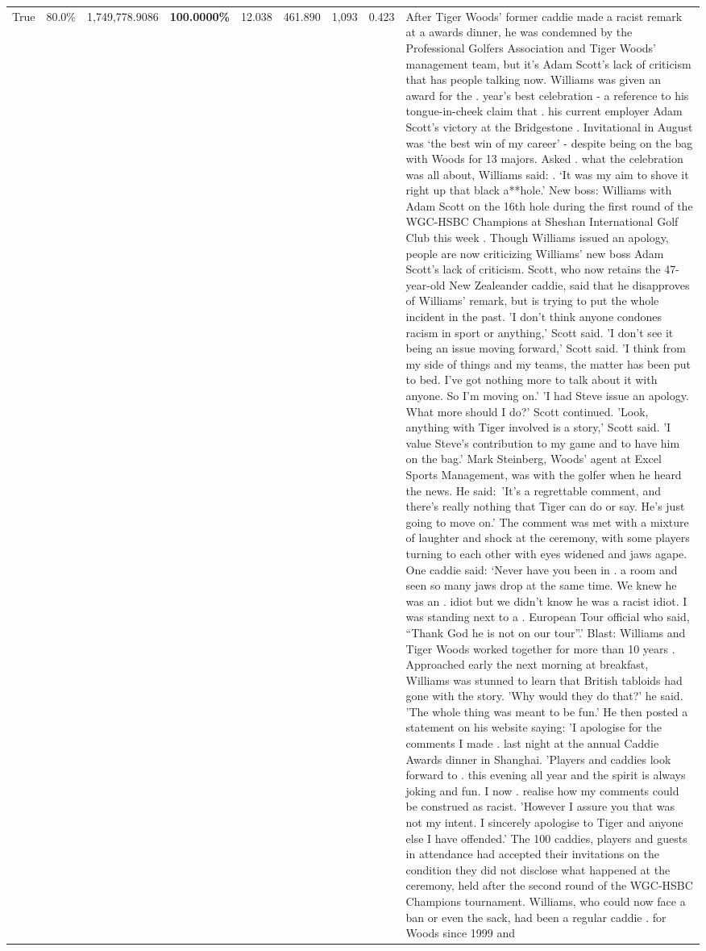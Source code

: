 \begin{table}[H]
\begin{tabular}{lllrlllll}
True & 80.0\% & 1,749,778.9086 & \bfseries \color{red} 100.0000\% & 12.038 & 461.890 & 1,093 & 0.423 & After Tiger Woods' former caddie made a racist remark at a awards dinner, he was condemned by the Professional Golfers Association and Tiger Woods' management team, but it's Adam Scott's lack of criticism that has people talking now. Williams was given an award for the . year’s best celebration - a reference to his tongue-in-cheek claim that . his current employer Adam Scott’s victory at the Bridgestone . Invitational in August was ‘the best win of my career’ - despite being on the bag with Woods for 13 majors. Asked . what the celebration was all about, Williams said: . ‘It was my aim to shove it right up that black a**hole.’ New boss: Williams with Adam Scott  on the 16th hole during the first round of the WGC-HSBC Champions at Sheshan International Golf Club this week . Though Williams issued an apology, people are now criticizing Williams' new boss Adam Scott's lack of criticism. Scott, who now retains the 47-year-old New Zealeander caddie, said that he disapproves of Williams' remark, but is trying to put the whole incident in the past. 'I don't think anyone condones racism in sport or anything,' Scott said. 'I don't see it being an issue moving forward,' Scott said. 'I think from my side of things and my teams, the matter has been put to bed. I've got nothing more to talk about it with anyone. So I'm moving on.' 'I had Steve issue an apology. What more should I do?' Scott continued. 'Look, anything with Tiger involved is a story,' Scott said. 'I value Steve's contribution to my game and to have him on the bag.' Mark Steinberg, Woods' agent at Excel Sports Management, was with the golfer when he heard the news. He said: 'It's a regrettable comment, and there's really nothing that Tiger can do or say. He's just going to move on.' The comment was met with a mixture of laughter and shock at the ceremony, with some players turning to each other with eyes widened and jaws agape. One caddie said: ‘Never have you been in . a room and seen so many jaws drop at the same time. We knew he was an . idiot but we didn’t know he was a racist idiot. I was standing next to a . European Tour official who said, “Thank God he is not on our tour”.’ Blast: Williams and Tiger Woods worked together for more than 10 years . Approached early the next morning at breakfast, Williams was stunned to learn that British tabloids had gone with the story. 'Why would they do that?' he said. 'The whole thing was meant to be fun.' He then posted a statement on his website saying: 'I apologise for the comments I made . last night at the annual Caddie Awards dinner in Shanghai. 'Players and caddies look forward to . this evening all year and the spirit is always joking and fun. I now . realise how my comments could be construed as racist. 'However I assure you that was not my intent. I sincerely apologise to Tiger and anyone else I have offended.' The 100 caddies, players and guests in attendance had accepted their invitations on the condition they did not disclose what happened at the ceremony, held after the second round of the WGC-HSBC Champions tournament. Williams, who could now face a ban or even the sack, had been a regular caddie . for Woods since 1999 and 
\end{tabular}
\end{table}
